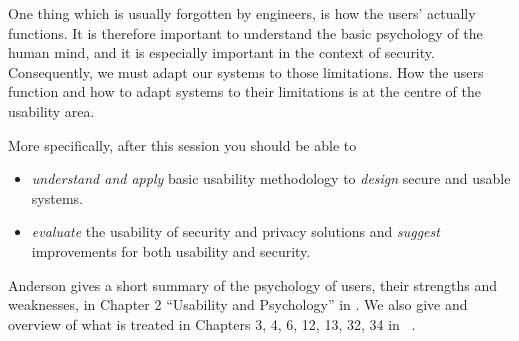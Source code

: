 One thing which is usually forgotten by engineers, is how the users' actually 
functions.
It is therefore important to understand the basic psychology of the human mind,
and it is especially important in the context of security.
Consequently, we must adapt our systems to those limitations.
How the users function and how to adapt systems to their limitations is at the 
centre of the usability area.

More specifically, after this session you should be able to
\begin{itemize}
  \item \emph{understand and apply} basic usability methodology to 
    \emph{design} secure and usable systems.
  \item \emph{evaluate} the usability of security and privacy solutions and 
    \emph{suggest} improvements for both usability and security.
\end{itemize}

Anderson gives a short summary of the psychology of users, their strengths and 
weaknesses, in Chapter 2 \enquote{Usability and Psychology} in 
\cite{Anderson2008sea}.
We also give and overview of what is treated in Chapters 3, 4, 6, 12, 13, 32, 
34 in ~\cite{SecurityAndUsability}.
